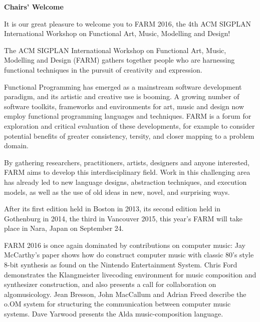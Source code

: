 \documentclass[10pt]{sigplanconf}
\begin{document}
\onecolumn

\pagestyle{empty}
\begin{center}
{\bfseries \Huge Chairs' Welcome}
\end{center}

\bigskip
\bigskip


It is our great pleasure to welcome you to FARM 2016, the 4th ACM
SIGPLAN International Workshop on Functional Art, Music, Modelling and
Design!

\medskip

The ACM SIGPLAN International Workshop on Functional Art, Music,
Modelling and Design (FARM) gathers together people who are harnessing
functional techniques in the pursuit of creativity and expression.

\medskip

Functional Programming has emerged as a mainstream software
development paradigm, and its artistic and creative use is booming. A
growing number of software toolkits, frameworks and environments for
art, music and design now employ functional programming languages and
techniques. FARM is a forum for exploration and critical evaluation of
these developments, for example to consider potential benefits of
greater consistency, tersity, and closer mapping to a problem domain.

\medskip

By gathering researchers, practitioners, artists, designers and anyone
interested, FARM aims to develop this interdisciplinary field. Work in
this challenging area has already led to new language designs,
abstraction techniques, and execution models, as well as the use of
old ideas in new, novel, and surprising ways.

\medskip

After its first edition held in Boston in 2013, its second edition held in
Gothenburg in 2014, the third in Vancouver 2015, this year's FARM will
take place in Nara, Japan on September 24.

\medskip

FARM 2016 is once again dominated by contributions on computer
music: Jay McCarthy's paper shows how do construct computer music with
classic 80's style 8-bit synthesis as found on the Nintendo
Entertainment System.  Chris Ford demonstrates the Klangmeister
livecoding environment for music composition and synthesizer
construction, and also presents a call for collaboration on
algomusicology.  Jean Bresson, John MacCallum and Adrian Freed
describe the o.OM system for structuring the communication between
computer music systems.  Dave Yarwood presents the Alda
music-composition language.
\end{document}
